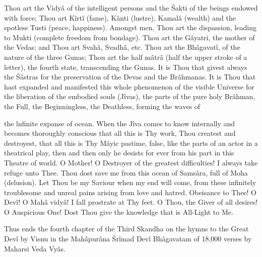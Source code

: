 Thou art the Vidy\^a of the intelligent persons and the \'Sakti of the be­ings endowed with force; Thou art K\^irt\^i (fame), K\^anti (lustre), Kamal\^a (wealth) and the spotless Tusti (peace, happiness). Amongst men, Thou art the dispassion, leading to Mukti (complete freedom from bondage). Thou art the G\^ayatri, the mother of the Vedas; and Thou art Svah\^a, Svadh\^a, etc. Thou art the Bh\^agavat\^i, of the nature of the three Gunas; Thou art the half m\^atr\^a (half the upper stroke of a letter), the fourth state, transcending the Gunas. It is Thou that givest always the \'S\^astras for the preservation of the Devas and the Br\^ahmanas. It is Thou that hast expanded and manifested this whole phenomenon of the visible Universe for the liberation of the embodied souls (J\^ivas), the parts of the pure holy Br\^ahman, the Full, the Beginningless, the Deathless, forming the waves of

the lnfinite expanse of ocean. When the J\^iva comes to know internally and becomes thoroughly conscious that all this is Thy work, Thou createst and destroyest, that all this is Thy M\^ayic pastime, false, like the parts of an actor in a theatrical play, then and then only he desists for ever from his part in this Theatre of world. O Mother! O Destroyer of the greatest difficulties! I always take refuge unto Thee. Thou dost save me from this ocean of Sams\^ara, full of Moha (delusion). Let Thou be my Saviour when my end will come, from these infinitely troublesome and unreal pains arising from love and hatred. Obeisance to Thee! O Dev\^i! O Mah\^a vidy\^a! I fall prostrate at Thy feet. O Thou, the Giver of all desires! O Auspicious One! Dost Thou give the knowledge that is All-Light to Me.

Thus ends the fourth chapter of the Third Skandha on the hymns to the Great Dev\^i by Visnu in the Mah\^apur\^ana \'Sr\^imad Dev\^i Bh\^agavatam of 18,000 verses by Maharsi Veda Vy\^as.